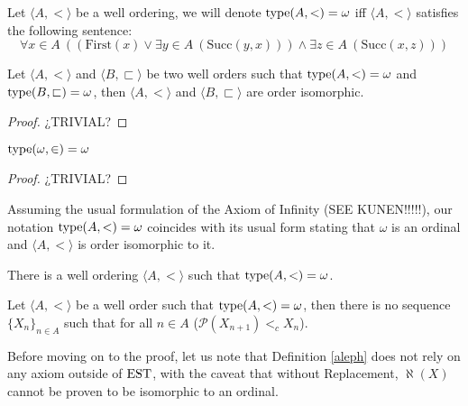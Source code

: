 \begin{definition}
	\label{omega_type}
	Let $\langle A,< \rangle$ be a well ordering, we will denote $\operatorname{type}(A,<) = \omega$ iff $\langle A,< \rangle$ satisfies the following sentence:
	\[
		\forall x\in A \ ((\text{First}(x) \lor \exists y\in A \ (\text{Succ}(y,x))) \land \exists z\in A \ (\text{Succ}(x,z)))
	\]
\end{definition}

\begin{lemma}[$\esti$]
	Let $\langle A,< \rangle$ and $\langle B,\sqsubset \rangle$ be two well orders such that $\operatorname{type}(A,<) = \omega$ and $\operatorname{type}(B,\sqsubset) = \omega$, then $\langle A,< \rangle$ and $\langle B,\sqsubset \rangle$ are order isomorphic.
\end{lemma}
\begin{proof}
	¿TRIVIAL?
\end{proof}

\begin{lemma}[$\esti$]
	$\operatorname{type}(\omega,\in) = \omega$
\end{lemma}
\begin{proof}
	¿TRIVIAL?
\end{proof}

\begin{corollary}
	Assuming the usual formulation of the Axiom of Infinity (SEE KUNEN!!!!!), our notation  $\operatorname{type}(A,<) = \omega$ coincides with its usual form stating that $\omega$ is an ordinal and $\langle A,< \rangle$ is order isomorphic to it.
\end{corollary}





\begin{prop}[$\esti$]
	There is a well ordering $\langle A,< \rangle$ such that 
	$\operatorname{type}(A,<) = \omega$.
\end{prop}

\begin{theorem}[$\esti$]
	\label{hartogs_set}
	Let $\langle A,< \rangle$ be a well order such that $\operatorname{type}(A,<) = \omega$, then there is no sequence $\{X_n\}_{n\in A}$ such that for all $n\in A$ ($\mathcal{P}(X_{n+1}) <_c X_n$).
\end{theorem}

Before moving on to the proof, let us note that Definition \ref{aleph} does not rely on any axiom outside of $\operatorname{EST}$, with the caveat that without Replacement, $\aleph(X)$ cannot be proven to be isomorphic to an ordinal.

